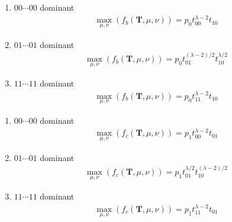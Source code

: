 ﻿\documentclass[a3paper,xelatex,english]{bxjsarticle}
\newcommand\mib[1]{\boldsymbol{#1}}
\begin{document}
\begin{enumerate}[{b)}-i)]
	\item $00 \cdots 00$ dominant 
	\begin{align}
	\max_{\mu, \nu}(f_{b}(\mib{T}, \mu, \nu)) = p_{0} t_{00}^{\lambda - 2} t_{10}
	 \label{expression:nonneg1}
	\end{align}
	\item $01 \cdots 01$ dominant 
	\begin{align}
	\max_{\mu, \nu}(f_{b}(\mib{T}, \mu, \nu)) = p_{0} t_{01}^{(\lambda - 2) / 2} t_{10}^{\lambda / 2}
	\end{align}
	\item $11 \cdots 11$ dominant 
	\begin{align}
	\max_{\mu, \nu}(f_{b}(\mib{T}, \mu, \nu)) = p_{0} t_{11}^{\lambda - 2} t_{10} \label{expression:neg2}
	\end{align}
\end{enumerate}

\begin{enumerate}[{c)}-i)]
	\item $00 \cdots 00$ dominant 
	\begin{align}
	\max_{\mu, \nu}(f_{c}(\mib{T}, \mu, \nu)) = p_{1} t_{00}^{\lambda - 2} t_{01} \label{expression:neg3}
	\end{align}
	\item $01 \cdots 01$ dominant 
	\begin{align}
	\max_{\mu, \nu}(f_{c}(\mib{T}, \mu, \nu)) = p_{1} t_{01}^{\lambda / 2} t_{10}^{(\lambda - 2) / 2}
	\end{align}
	\item $11 \cdots 11$ dominant 
	\begin{align}
	\max_{\mu, \nu}(f_{c}(\mib{T}, \mu, \nu)) = p_{1} t_{11}^{\lambda - 2} t_{01}
	\end{align}
\end{enumerate}
\end{document}
